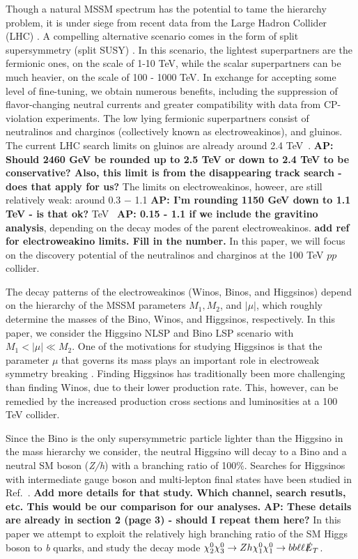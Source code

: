 \documentclass[a4paper,11pt]{article}
\newcommand{\Shufang}[1]{{\bf\color{Maroon}  #1}}
\newcommand{\Adarsh}[1]{{\bf\color{RoyalBlue} AP: #1}}
\newcommand{\met}{{\slashed{E}_T}}
\begin{document}
Though a natural MSSM spectrum has the potential to tame the hierarchy
problem, it is under siege from recent data from the Large Hadron
Collider (LHC) \cite{Aaboud:2018ujj, Sirunyan:2018vjp}. 
A compelling alternative scenario comes in the form of
split supersymmetry (split SUSY) \citep{Wells:2003tf,
ArkaniHamed:2004yi, Giudice:2004tc}. In this scenario, the lightest
superpartners are the fermionic ones, on the
scale of 1-10 TeV, while the scalar superpartners can be much heavier,
on the scale of 100 - 1000 TeV. In exchange for accepting some level of
fine-tuning, we obtain numerous benefits, including the suppression of
flavor-changing neutral currents and greater compatibility with data
from CP-violation experiments.  The low lying 
fermionic superpartners consist of neutralinos and charginos (collectively
known as electroweakinos), and gluinos. The current LHC search limits on
gluinos are already around 2.4 TeV~\cite{CMS-PAS-SUS-19-005}. \Adarsh{Should
2460 GeV be rounded up to 2.5 TeV or down to 2.4 TeV to be conservative? Also,
this limit is from the disappearing track search - does that apply for us?} The
limits on electroweakinos,
howeer, are still relatively weak: around 0.3 $-$ 1.1 \Adarsh{I'm rounding 1150
GeV down to 1.1 TeV - is that ok?}
TeV~\cite{ATL-PHYS-PUB-2019-022, Sirunyan:2017lae} \Adarsh{0.15
- 1.1 if we include the gravitino analysis}, depending on
the decay modes of the parent electroweakinos.  \Shufang{add ref for 
electroweakino limits. Fill in the number.} In this paper, we will
focus on the discovery potential of the neutralinos and charginos at the 100
TeV $pp$ collider. 

The decay patterns of the electroweakinos (Winos, Binos, and Higgsinos)
depend on the hierarchy of the MSSM parameters $M_1, M_2$, and $|\mu|$, which 
roughly determine the masses of the Bino, Winos, and Higgsinos, respectively.
In this paper, we consider the Higgsino NLSP and Bino LSP scenario with $M_1 < |\mu| \ll M_2$.
One of the motivations for studying Higgsinos is that the parameter $\mu$ 
that governs its mass plays an important role in electroweak symmetry breaking 
\citep{Acharya:2014pua}. Finding Higgsinos has traditionally been more challenging 
than finding Winos, due to their lower production rate. This, however, can 
be remedied by the increased  production cross sections and luminosities 
at a 100 TeV collider.


 

Since the Bino is the only supersymmetric particle lighter than the Higgsino in
the mass hierarchy we consider, the neutral Higgsino will decay to a Bino and a
neutral SM boson (\emph{Z/h}) with a branching ratio of 100\%.  Searches for
Higgsinos with intermediate gauge boson and multi-lepton final states have been
studied in Ref.~\cite{Gori:2014oua}. \Shufang{Add more details for that study.
Which channel, search resutls, etc. This would be our comparison for our
analyses.} \Adarsh{These details are already in section 2 (page 3) - should I
repeat them here?}  In this paper we attempt to exploit the relatively high branching
ratio of the SM Higgs boson to \emph{b} quarks, and study the decay mode
$\chi_2^0\chi_3^0\rightarrow Zh \chi_1^0\chi_1^0\rightarrow bb\ell\ell \met$.
\end{document}
